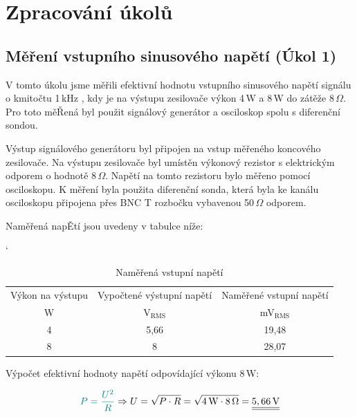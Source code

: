 \documentclass[a4paper, czech]{article}
\begin{document}
\pagebreak

\section{Zpracování úkolů}

\subsection{Měření vstupního sinusového napětí (Úkol 1)}

V tomto úkolu jsme měřili efektivní hodnotu vstupního sinusového napětí signálu o kmitočtu
1\,kHz , kdy je na výstupu zesilovače výkon 4\,W a 8\,W do zátěže 8\,$\Omega$.
Pro toto měŘená byl použit signálový generátor a osciloskop spolu s diferenční sondou.

Výstup signálového generátoru byl připojen na vstup měřeného koncového zesilovače.
Na výstupu zesilovače byl umístěn výkonový rezistor s elektrickým odporem o hodnotě 8\,$\Omega$.
Napětí na tomto rezistoru bylo měřeno pomocí osciloskopu.
K měření byla použita diferenční sonda, která byla ke kanálu osciloskopu připojena
přes BNC T rozbočku vybavenou 50\,$\Omega$ odporem.

Naměřená napĚtí jsou uvedeny v tabulce níže:

\begin{table}[H]
    \catcode`
    \centering
    \begin{tabular}{ccc}
        \toprule
        Výkon na výstupu & Vypočtené výstupní napětí & Naměřené vstupní napětí \\
        \cmidrule(rl){1-1}
        \cmidrule(rl){2-2}
        \cmidrule(rl){3-3}
        W                & V$_\text{RMS}$             & mV$_\text{RMS}$        \\
        \midrule
        4                & 5,66                       & 19,48                  \\
        8                & 8                          & 28,07                  \\
        \bottomrule
    \end{tabular}
    \caption{Naměřená vstupní napětí}
\end{table}

Výpočet efektivní hodnoty napětí odpovídající výkonu 8\,W:

\begin{equation*}
    \textcolor{teal}{P = \frac{U^2}{R}} \Rightarrow U = \sqrt{P \cdot R} = \sqrt{4\,\text{W} \cdot 8\,\Omega} = \underline{\underline{5,66\,\text{V}}}
\end{equation*}
\end{document}
